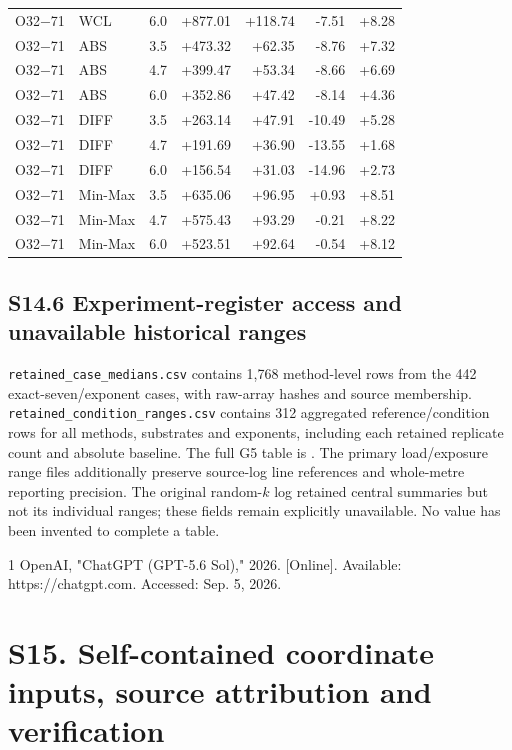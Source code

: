 \documentclass[journal,onecolumn,10pt]{IEEEtran}
\begin{document}
\begin{longtable}{@{}llrrrrr@{}}
O32$-$71 & WCL & 6.0 & +877.01 & +118.74 & -7.51 & +8.28 \\
O32$-$71 & ABS & 3.5 & +473.32 & +62.35 & -8.76 & +7.32 \\
O32$-$71 & ABS & 4.7 & +399.47 & +53.34 & -8.66 & +6.69 \\
O32$-$71 & ABS & 6.0 & +352.86 & +47.42 & -8.14 & +4.36 \\
O32$-$71 & DIFF & 3.5 & +263.14 & +47.91 & -10.49 & +5.28 \\
O32$-$71 & DIFF & 4.7 & +191.69 & +36.90 & -13.55 & +1.68 \\
O32$-$71 & DIFF & 6.0 & +156.54 & +31.03 & -14.96 & +2.73 \\
O32$-$71 & Min-Max & 3.5 & +635.06 & +96.95 & +0.93 & +8.51 \\
O32$-$71 & Min-Max & 4.7 & +575.43 & +93.29 & -0.21 & +8.22 \\
O32$-$71 & Min-Max & 6.0 & +523.51 & +92.64 & -0.54 & +8.12 \\
\end{longtable}
\endgroup
\subsection*{S14.6 Experiment-register access and unavailable historical ranges}
\texttt{retained\_case\_medians.csv} contains 1,768 method-level rows from the 442 exact-seven/exponent cases, with raw-array hashes and source membership. \texttt{retained\_condition\_ranges.csv} contains 312 aggregated reference/condition rows for all methods, substrates and exponents, including each retained replicate count and absolute baseline. The full G5 table is . The primary load/exposure range files additionally preserve source-log line references and whole-metre reporting precision. The original random-$k$ log retained central summaries but not its individual ranges; these fields remain explicitly unavailable. No value has been invented to complete a table.

\begin{thebibliography}{1}
 OpenAI, "ChatGPT (GPT-5.6 Sol)," 2026. [Online]. Available: https://chatgpt.com. Accessed: Sep. 5, 2026.
\end{thebibliography}

\section*{S15. Self-contained coordinate inputs, source attribution and verification}
\label{s15-input-provenance}
\end{document}
